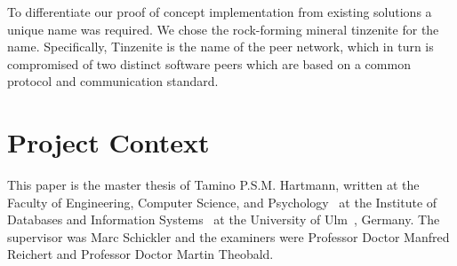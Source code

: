 To differentiate our proof of concept implementation from existing solutions a unique name was required.
We chose the rock-forming mineral tinzenite for the name.
Specifically, Tinzenite is the name of the peer network, which in turn is compromised of two distinct software peers which are based on a common protocol and communication standard.

\section{Project Context}

This paper is the master thesis of Tamino P.S.M. Hartmann, written at the Faculty of Engineering, Computer Science, and Psychology~\cite{web:site:faculty} at the Institute of Databases and Information Systems~\cite{web:site:institute} at the University of Ulm~\cite{web:site:uni_ulm}, Germany.
The supervisor was Marc Schickler and the examiners were Professor Doctor Manfred Reichert and Professor Doctor Martin Theobald.
